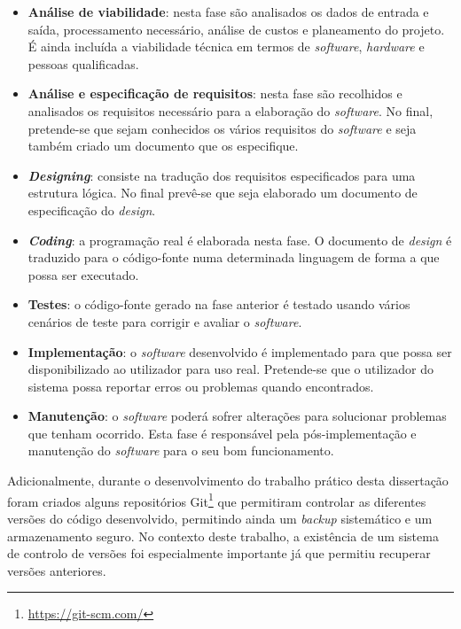\begin{itemize}
	\item \textbf{Análise de viabilidade}: nesta fase são analisados os dados de entrada e saída, processamento necessário, análise de custos e planeamento do projeto. É ainda incluída a viabilidade técnica em termos de \textit{software}, \textit{hardware} e pessoas qualificadas. 
	
	\item \textbf{Análise e especificação de requisitos}: nesta fase são recolhidos e analisados os requisitos necessário para a elaboração do \textit{software}. No final, pretende-se que sejam conhecidos os vários requisitos do \textit{software} e seja também criado um documento que os especifique. 
	
	\item  \textbf{\textit{Designing}}: consiste na tradução dos requisitos especificados para uma estrutura lógica. No final prevê-se que seja elaborado um documento de especificação do \textit{design}. 
	
	
	\item  \textbf{\textit{Coding}}: a programação real é elaborada nesta fase. O documento de \textit{design} é traduzido para o código-fonte numa determinada linguagem de forma a que possa ser executado. 
	
	\item \textbf{Testes}: o código-fonte gerado na fase anterior é testado usando vários cenários de teste para corrigir e avaliar o \textit{software}. 
	
	\item  \textbf{Implementação}: o \textit{software} desenvolvido é implementado para que possa ser disponibilizado ao utilizador para uso real. Pretende-se que o utilizador do sistema possa reportar erros ou problemas quando encontrados. 
	
	\item  \textbf{Manutenção}: o \textit{software} poderá sofrer alterações para solucionar problemas que tenham ocorrido. Esta fase é responsável pela pós-implementação e manutenção do \textit{software} para o seu bom funcionamento.
	
\end{itemize}


Adicionalmente, durante o desenvolvimento do trabalho prático desta dissertação foram criados alguns repositórios Git\footnote{\url{https://git-scm.com/}} que permitiram controlar as diferentes versões do código desenvolvido, permitindo ainda um \textit{backup} sistemático e um armazenamento seguro. No contexto deste trabalho, a existência de um sistema de controlo de versões foi especialmente importante já que permitiu recuperar versões anteriores. 








